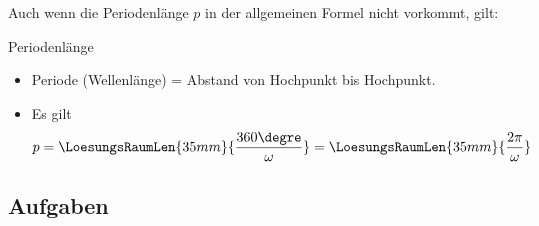 Auch wenn die Periodenlänge $p$ in der allgemeinen Formel nicht
vorkommt, gilt:
\begin{gesetz}{Periodenlänge}{}

  \begin{itemize}
  \item Periode (Wellenlänge) = Abstand von Hochpunkt bis Hochpunkt.

  
  \item
  Es gilt $$p=\LoesungsRaumLen{35mm}{\frac{360\degre}{\omega}}=\LoesungsRaumLen{35mm}{\frac{2\pi}{\omega}}$$
\end{itemize}
  \end{gesetz}

\newpage



\subsection*{Aufgaben}




